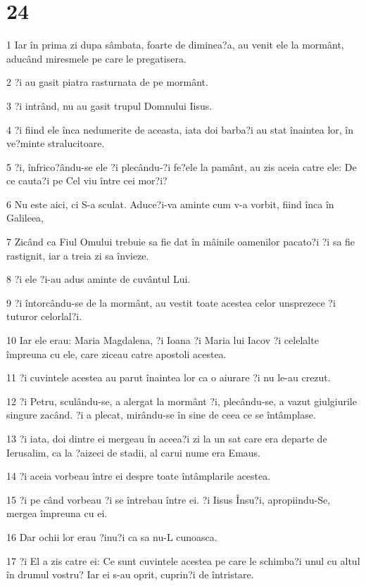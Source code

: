 \chapter{24}

\par 1 Iar în prima zi dupa sâmbata, foarte de diminea?a, au venit ele la mormânt, aducând miresmele pe care le pregatisera.
\par 2 ?i au gasit piatra rasturnata de pe mormânt.
\par 3 ?i intrând, nu au gasit trupul Domnului Iisus.
\par 4 ?i fiind ele înca nedumerite de aceasta, iata doi barba?i au stat înaintea lor, în ve?minte stralucitoare.
\par 5 ?i, înfrico?ându-se ele ?i plecându-?i fe?ele la pamânt, au zis aceia catre ele: De ce cauta?i pe Cel viu între cei mor?i?
\par 6 Nu este aici, ci S-a sculat. Aduce?i-va aminte cum v-a vorbit, fiind înca în Galileea,
\par 7 Zicând ca Fiul Omului trebuie sa fie dat în mâinile oamenilor pacato?i ?i sa fie rastignit, iar a treia zi sa învieze.
\par 8 ?i ele ?i-au adus aminte de cuvântul Lui.
\par 9 ?i întorcându-se de la mormânt, au vestit toate acestea celor unsprezece ?i tuturor celorlal?i.
\par 10 Iar ele erau: Maria Magdalena, ?i Ioana ?i Maria lui Iacov ?i celelalte împreuna cu ele, care ziceau catre apostoli acestea.
\par 11 ?i cuvintele acestea au parut înaintea lor ca o aiurare ?i nu le-au crezut.
\par 12 ?i Petru, sculându-se, a alergat la mormânt ?i, plecându-se, a vazut giulgiurile singure zacând. ?i a plecat, mirându-se în sine de ceea ce se întâmplase.
\par 13 ?i iata, doi dintre ei mergeau în aceea?i zi la un sat care era departe de Ierusalim, ca la ?aizeci de stadii, al carui nume era Emaus.
\par 14 ?i aceia vorbeau între ei despre toate întâmplarile acestea.
\par 15 ?i pe când vorbeau ?i se întrebau între ei. ?i Iisus Însu?i, apropiindu-Se, mergea împreuna cu ei.
\par 16 Dar ochii lor erau ?inu?i ca sa nu-L cunoasca.
\par 17 ?i El a zis catre ei: Ce sunt cuvintele acestea pe care le schimba?i unul cu altul în drumul vostru? Iar ei s-au oprit, cuprin?i de întristare.
